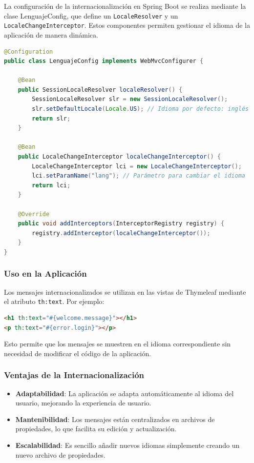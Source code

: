 \documentclass[draft]{scrbook}
\begin{document}
La configuración de la internacionalización en Spring Boot se realiza mediante la clase LenguajeConfig, que define un \texttt{LocaleResolver} y un \texttt{LocaleChangeInterceptor}. Estos componentes permiten gestionar el idioma de la aplicación de manera dinámica.

\begin{lstlisting}[language=Java]
@Configuration
public class LenguajeConfig implements WebMvcConfigurer {

    @Bean
    public SessionLocaleResolver localeResolver() {
        SessionLocaleResolver slr = new SessionLocaleResolver();
        slr.setDefaultLocale(Locale.US); // Idioma por defecto: inglés
        return slr;
    }
    
    @Bean
    public LocaleChangeInterceptor localeChangeInterceptor() {
        LocaleChangeInterceptor lci = new LocaleChangeInterceptor();
        lci.setParamName("lang"); // Parámetro para cambiar el idioma
        return lci;
    }
    
    @Override
    public void addInterceptors(InterceptorRegistry registry) {
        registry.addInterceptor(localeChangeInterceptor());
    }
}
\end{lstlisting}

\subsubsection{Uso en la Aplicación}

Los mensajes internacionalizados se utilizan en las vistas de Thymeleaf mediante el atributo \texttt{th:text}. Por ejemplo:

\begin{lstlisting}[language=html]
<h1 th:text="#{welcome.message}"></h1>
<p th:text="#{error.login}"></p>
\end{lstlisting}

Esto permite que los mensajes se muestren en el idioma correspondiente sin necesidad de modificar el código de la aplicación.

\subsubsection{Ventajas de la Internacionalización}

\begin{itemize}
    \item \textbf{Adaptabilidad}: La aplicación se adapta automáticamente al idioma del usuario, mejorando la experiencia de usuario.
    \item \textbf{Mantenibilidad}: Los mensajes están centralizados en archivos de propiedades, lo que facilita su edición y actualización.
    \item \textbf{Escalabilidad}: Es sencillo añadir nuevos idiomas simplemente creando un nuevo archivo de propiedades.
\end{itemize}
\end{document}
